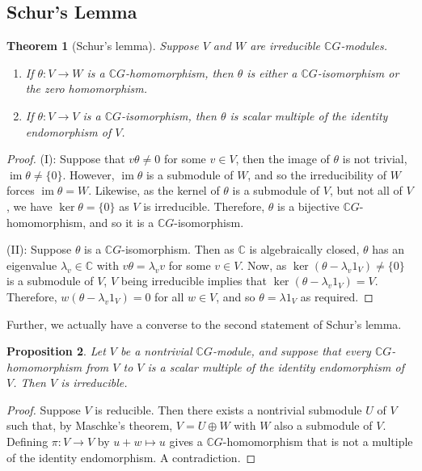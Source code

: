 \documentclass[11pt, notitlepage]{article}
\numberwithin{equation}{section}
\theoremstyle{plain}
\newtheorem{theorem}{Theorem}[section]
\newtheorem{proposition}[theorem]{Proposition}
\theoremstyle{definition}
\newcommand{\C}{\mathbb{C}}
\DeclareMathOperator{\im}{im}
\begin{document}
\subsection{Schur's Lemma}

\begin{theorem}[Schur's lemma]
Suppose $V$ and $W$ are irreducible $\C G$-modules.
\begin{enumerate}[label=\emph{(\Roman*)}]
    \item If $\theta : V \to W$ is a $\C G$-homomorphism, then $\theta$ is either a $\C G$-isomorphism or the zero homomorphism.
    
    \item If $\theta : V \to V$ is a $\C G$-isomorphism, then $\theta$ is scalar multiple of the identity endomorphism of $V$.
\end{enumerate}
\end{theorem}

\begin{proof}
(I): Suppose that $v\theta \neq 0$ for some $v \in V$, then the image of $\theta$ is not trivial, $\im \theta \neq \{0\}$. However, $\im\theta$ is a submodule of $W$, and so the irreducibility of $W$ forces $\im \theta = W$. Likewise, as the kernel of $\theta$ is a submodule of $V$, but not all of $V$, we have $\ker \theta = \{0\}$ as $V$ is irreducible. Therefore, $\theta$ is a bijective $\C G$-homomorphism, and so it is a $\C G$-isomorphism.

(II): Suppose $\theta$ is a $\C G$-isomorphism. Then as $\C$ is algebraically closed, $\theta$ has an eigenvalue $\lambda_v \in \C$ with $v \theta = \lambda_v v$ for some $v \in V$. Now, as $\ker(\theta - \lambda_v 1_V) \neq \{0\}$ is a submodule of $V$, $V$ being irreducible implies that $\ker(\theta - \lambda_v1_V) = V$. Therefore, $w(\theta - \lambda_v1_V) = 0$ for all $w \in V$, and so $\theta = \lambda 1_V$ as required. 
\end{proof}

Further, we actually have a converse to the second statement of Schur's lemma.

\begin{proposition}
Let $V$ be a nontrivial $\C G$-module, and suppose that every $\C G$-homomorphism from $V$ to $V$ is a scalar multiple of the identity endomorphism of $V$. Then $V$ is irreducible.
\end{proposition}

\begin{proof}
Suppose $V$ is reducible. Then there exists a nontrivial submodule $U$ of $V$ such that, by Maschke's theorem, $V = U \oplus W$ with $W$ also a submodule of $V$. Defining $\pi : V \to V$ by $u + w \mapsto u$ gives a $\C G$-homomorphism that is not a multiple of the identity endomorphism. A contradiction.
\end{proof}
\end{document}
